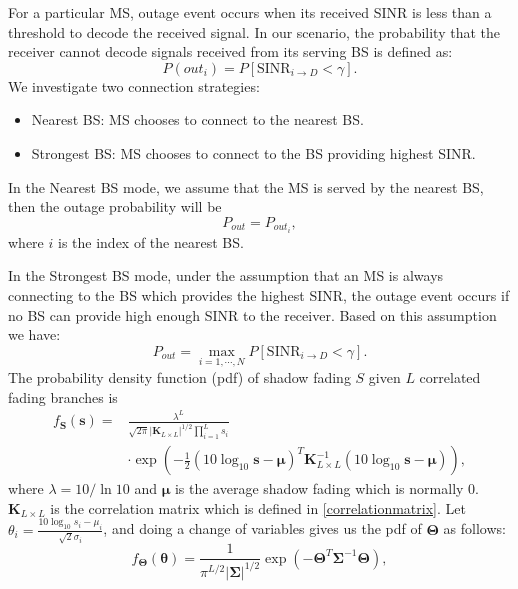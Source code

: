 \documentclass[journal,10pt]{IEEEtran}
\begin{document}
 \par For a particular MS, outage event occurs when its received SINR is less than a threshold to decode the received signal. In our scenario, the probability that the receiver cannot decode signals received from its serving BS is defined as:
 \begin{equation}
 P(out_{i}) = P[\text{SINR}_{i\to D} < \gamma].
 \end{equation}
 We investigate two connection strategies: 
 \begin{itemize}
 \item Nearest BS: MS chooses to connect to the nearest BS.
 \item Strongest BS: MS chooses to connect to the BS providing highest SINR.
 \end{itemize}
 \par In the Nearest BS mode, we assume that the MS is served by the nearest BS, then the outage probability will be 
 \begin{equation}
 P_{out} = P_{out_{i}},
 \end{equation} 
 where $i$ is the index of the nearest BS. 
 \par In the Strongest BS mode, under the assumption that an MS is always connecting to the BS which provides the highest SINR, the outage event occurs if no BS can provide high enough SINR to the receiver. Based on this assumption we have:
 \begin{equation}
 P_{out} = \max_{i = 1,\cdots,N} P[\text{SINR}_{i\to D}<\gamma].
 \end{equation}
 The probability density function (pdf) of shadow fading $S$ given $L$ correlated fading branches is
 \begin{equation}
 \begin{split}
 f_{\mathbf{S}}(\mathbf{s}) = &\frac{\lambda^{L}}{\sqrt{2\pi}|\mathbf{K}_{L\times L}|^{1/2}\prod_{i=1}^{L}s_{i}}\\
 &\cdot\exp(-\frac{1}{2}(10\log_{10}\mathbf{s}-\boldsymbol{\mu})^{T}\mathbf{K}_{L\times L}^{-1}(10\log_{10}\mathbf{s}-\boldsymbol{\mu})),
 \end{split}
 \end{equation}
 where $\lambda = 10/\ln10$ and $\boldsymbol{\mu}$ is the average shadow fading which is normally $0$. $\mathbf{K}_{L\times L}$ is the correlation matrix which is defined in \eqref{correlationmatrix}. Let $\theta_{i} = \frac{10\log_{10}s_{i}-\mu_{i}}{\sqrt{2}\sigma_{i}}$, and doing a change of variables gives us the pdf of $\mathbf{\Theta}$ as follows:
 \begin{equation}
 f_{\mathbf{\Theta}}(\boldsymbol{\theta}) = \frac{1}{\pi^{L/2}|\mathbf{\Sigma}|^{1/2}}\exp(-\mathbf{\Theta}^{T}\mathbf{\Sigma}^{-1}\mathbf{\Theta}),
 \end{equation}
\end{document}
